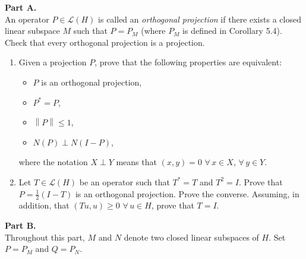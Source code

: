 \documentclass[12pt]{article}
\newcommand{\norm}[1]{\left\|#1\right\|}
\begin{document}
\noindent\textbf{Part A.}\\
An operator $P \in \mathcal{L}(H)$ is called an \emph{orthogonal projection} if there exists a closed
linear subspace $M$ such that $P = P_M$ (where $P_M$ is defined in Corollary 5.4). Check
that every orthogonal projection is a projection.
 
\begin{enumerate}
\item Given a projection $P$, prove that the following properties are equivalent:
\begin{itemize}
    \item[(a)] $P$ is an orthogonal projection,
    \item[(b)] $P^* = P$,
    \item[(c)] $\norm{P} \le 1$,
    \item[(d)] $N(P) \perp N(I-P)$,
\end{itemize}
where the notation $X \perp Y$ means that $(x,y) = 0$ $\forall\, x \in X$, $\forall\, y \in Y$.
 
\item Let $T \in \mathcal{L}(H)$ be an operator such that $T^* = T$ and $T^2 = I$.
Prove that $P = \frac{1}{2}(I - T)$ is an orthogonal projection. Prove the converse.
Assuming, in addition, that $(Tu, u) \ge 0$ $\forall\, u \in H$, prove that $T = I$.
\end{enumerate}
 
\noindent\textbf{Part B.}\\
Throughout this part, $M$ and $N$ denote two closed linear subspaces of $H$. Set
$P = P_M$ and $Q = P_N$.
 
\end{document}
